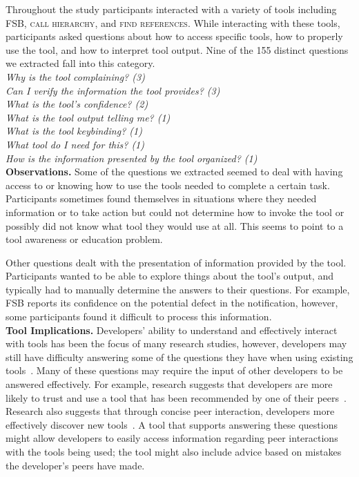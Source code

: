 \documentclass[conference]{IEEEtran}
\begin{document}
Throughout the study participants interacted with a variety of tools including FSB, \textsc{call hierarchy}, and \textsc{find references}. 
While interacting with these tools, participants asked questions about how to access specific tools, how to properly use the tool, and how to interpret tool output. 
Nine of the 155 distinct questions we extracted fall into this category.
\\

\noindent\emph{Why is the tool complaining? (3)} \\
\emph{Can I verify the information the tool provides? (3)} \\
\emph{What is the tool's confidence? (2)} \\
\emph{What is the tool output telling me? (1)} \\
\emph{What is the tool keybinding? (1)} \\
\emph{What tool do I need for this? (1)} \\
\emph{How is the information presented by the tool organized? (1)} \\


\noindent\textbf{Observations.}
Some of the questions we extracted seemed to deal with having access to or knowing how to use the tools needed to complete a certain task. 
Participants sometimes found themselves in situations where they needed information or to take action but could not determine how to invoke the tool or possibly did not know what tool they would use at all. 
This seems to point to a tool awareness or education problem.

Other questions dealt with the presentation of information provided by the tool. 
Participants wanted to be able to explore things about the tool's output, and typically had to manually determine the answers to their questions. 
For example, FSB reports its confidence on the potential defect in the notification, however, some participants found it difficult to process this information.
\\


\noindent\textbf{Tool Implications.}
Developers' ability to understand and effectively interact with tools has been the focus of many research studies, however, developers may still have difficulty answering some of the questions they have when using existing tools~\cite{ko2004designing, khoo2008path, johnson2013don}. 
Many of these questions may require the input of other developers to be answered effectively. 
For example, research suggests that developers are more likely to trust and use a tool that has been recommended by one of their peers~\cite{murphy2010trust}.
Research also suggests that through concise peer interaction, developers more effectively discover new tools~\cite{murphy2011peer}. 
A tool that supports answering these questions might allow developers to easily access information regarding peer interactions with the tools being used; the tool might also include advice based on mistakes the developer's peers have made. 
 
\end{document}
